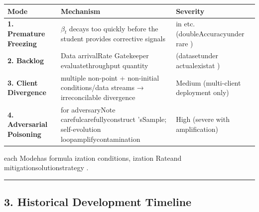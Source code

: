 \documentclass[
  12pt,
]{article}
\begin{document}
\begin{longtable}[]{@{}
  >{\raggedright\arraybackslash}p{}
  >{\raggedright\arraybackslash}p{}
  >{\raggedright\arraybackslash}p{}@{}}
\toprule\noalign{}
\begin{minipage}[b]{\linewidth}\raggedright
Mode
\end{minipage} & \begin{minipage}[b]{\linewidth}\raggedright
Mechanism
\end{minipage} & \begin{minipage}[b]{\linewidth}\raggedright
Severity
\end{minipage} \\
\midrule\noalign{}
\endhead
\bottomrule\noalign{}
\endlastfoot
\textbf{1. Premature Freezing} & \(\beta_t\) decays too quickly before the student provides corrective signals &
in etc.(doubleAccuracyunder rare ) \\
\textbf{2. Backlog} & Data arrivalRate Gatekeeper evaluatethroughput quantity  &
(datasetunder actualexistat ) \\
\textbf{3. Client Divergence} & multiple non-point  + non-initial conditions/data streams →
irreconcilable divergence & Medium (multi-client deployment only) \\
\textbf{4. Adversarial Poisoning} & for adversaryNote carefulcarefullyconstruct 'sSample; self-evolution loopamplifycontamination &
High (severe with amplification) \\
\end{longtable}

each Modehas formula ization conditions, ization Rateand mitigationsolutionstrategy . 

\begin{center}\rule{0.5\linewidth}{0.5pt}\end{center}

\subsection{3.
Historical Development Timeline}\label{ux5386ux53f2ux53d1ux5c55ux65f6ux95f4ux7ebf}
\end{document}
